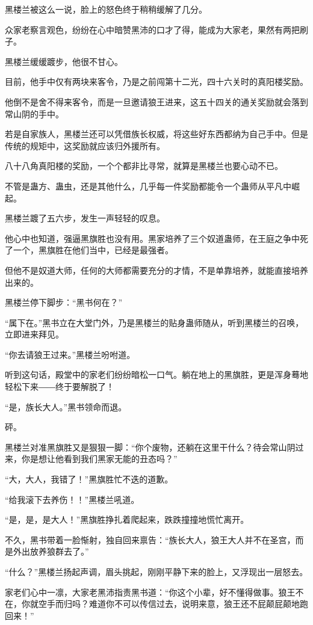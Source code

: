 \begin{this_body}
黑楼兰被这么一说，脸上的怒色终于稍稍缓解了几分。

众家老察言观色，纷纷在心中暗赞黑沛的口才了得，能成为大家老，果然有两把刷子。

黑楼兰缓缓踱步，他很不甘心。

目前，他手中仅有两块来客令，乃是之前闯第十二光，四十六关时的真阳楼奖励。

他倒不是舍不得来客令，而是一旦邀请狼王进来，这五十四关的通关奖励就会落到常山阴的手中。

若是自家族人，黑楼兰还可以凭借族长权威，将这些好东西都纳为自己手中。但是传统的规矩中，这奖励就应该归外援所有。

八十八角真阳楼的奖励，一个个都非比寻常，就算是黑楼兰也要心动不已。

不管是蛊方、蛊虫，还是其他什么，几乎每一件奖励都能令一个蛊师从平凡中崛起。

黑楼兰踱了五六步，发生一声轻轻的叹息。

他心中也知道，强逼黑旗胜也没有用。黑家培养了三个奴道蛊师，在王庭之争中死了一个，黑旗胜在他们当中，已经是最强者。

但他不是奴道大师，任何的大师都需要充分的才情，不是单靠培养，就能直接培养出来的。

黑楼兰停下脚步：“黑书何在？”

“属下在。”黑书立在大堂门外，乃是黑楼兰的贴身蛊师随从，听到黑楼兰的召唤，立即进来拜见。

“你去请狼王过来。”黑楼兰吩咐道。

听到这句话，殿堂中的家老们纷纷暗松一口气。躺在地上的黑旗胜，更是浑身蓦地轻松下来――终于要解脱了！

“是，族长大人。”黑书领命而退。

砰。

黑楼兰对准黑旗胜又是狠狠一脚：“你个废物，还躺在这里干什么？待会常山阴过来，你是想让他看到我们黑家无能的丑态吗？”

“大，大人，我错了！”黑旗胜忙不迭的道歉。

“给我滚下去养伤！！”黑楼兰吼道。

“是，是，是大人！”黑旗胜挣扎着爬起来，跌跌撞撞地慌忙离开。

不久，黑书带着一脸惭射，独自回来禀告：“族长大人，狼王大人并不在圣宫，而是外出放养狼群去了。”

“什么？”黑楼兰扬起声调，眉头挑起，刚刚平静下来的脸上，又浮现出一层怒去。

家老们心中一凛，大家老黑沛指责黑书道：“你这个小辈，好不懂得做事。狼王不在，你就空手而归吗？难道你不可以传信过去，说明来意，狼王还不屁颠屁颠地跑回来！”


\end{this_body}

